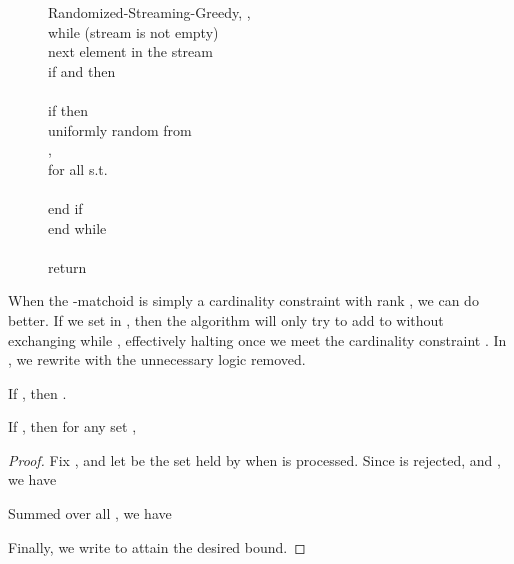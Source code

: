 \documentclass[oneside,letterpaper]{scrartcl} \usepackage{macros}
\begin{document}
\begin{figure}
\centering
  \begin{minipage}{7.15cm}
    \begin{framed}
      \begin{pseudocode}
        \begin{routine}
          {Randomized-Streaming-Greedy}{,}
          ,  \\
          while (stream is not empty) \\
          \>  next element in the stream \\
          \> if  and  then \\
          \> \>  \\
          \> if  then \\
          \> \>  uniformly random from   \\
          \> \> ,  \\
          \> \> for all  s.t.\  \\
          \> \> \> \\
          \> end if \\
          end while \\
          \\
          return 
        \end{routine}
      \end{pseudocode}
    \end{framed}
    \vspace{.5em}
\caption{}


  \end{minipage}
\end{figure}

When the -matchoid is simply a cardinality constraint with rank
, we can do better. If we set  in
, then the
algorithm will only try to add to  without exchanging while
, effectively halting once we meet the cardinality
constraint . In
, we rewrite
 with the
unnecessary logic removed.


\newcommand{\sizeoffinalset}{|\finalset|}
\begin{lemma}  If , then .
\end{lemma}

\begin{lemma}
   If , then for any set ,
  
\end{lemma}
\begin{proof}
  Fix , and let 
  be the set held by  when  is processed. Since  is
  rejected, and , we have
  
  Summed over all , we have
  
  Finally, we write
   to attain the desired bound.
\end{proof}
\end{document}
